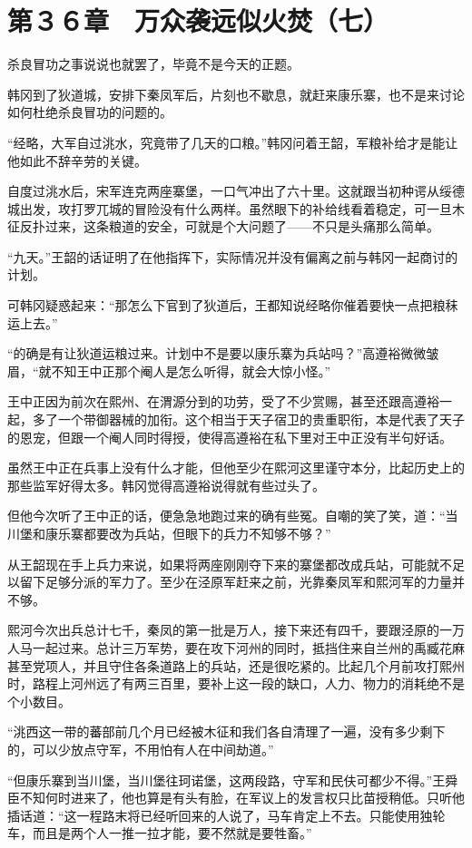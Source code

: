 \section{第３６章　万众袭远似火焚（七）}

杀良冒功之事说说也就罢了，毕竟不是今天的正题。

韩冈到了狄道城，安排下秦凤军后，片刻也不歇息，就赶来康乐寨，也不是来讨论如何杜绝杀良冒功的问题的。

“经略，大军自过洮水，究竟带了几天的口粮。”韩冈问着王韶，军粮补给才是能让他如此不辞辛劳的关键。

自度过洮水后，宋军连克两座寨堡，一口气冲出了六十里。这就跟当初种谔从绥德城出发，攻打罗兀城的冒险没有什么两样。虽然眼下的补给线看着稳定，可一旦木征反扑过来，这条粮道的安全，可就是个大问题了——不只是头痛那么简单。

“九天。”王韶的话证明了在他指挥下，实际情况并没有偏离之前与韩冈一起商讨的计划。

可韩冈疑惑起来：“那怎么下官到了狄道后，王都知说经略你催着要快一点把粮秣运上去。”

“的确是有让狄道运粮过来。计划中不是要以康乐寨为兵站吗？”高遵裕微微皱眉，“就不知王中正那个阉人是怎么听得，就会大惊小怪。”

王中正因为前次在熙州、在渭源分到的功劳，受了不少赏赐，甚至还跟高遵裕一起，多了一个带御器械的加衔。这个相当于天子宿卫的贵重职衔，本是代表了天子的恩宠，但跟一个阉人同时得授，使得高遵裕在私下里对王中正没有半句好话。

虽然王中正在兵事上没有什么才能，但他至少在熙河这里谨守本分，比起历史上的那些监军好得太多。韩冈觉得高遵裕说得就有些过头了。

但他今次听了王中正的话，便急急地跑过来的确有些冤。自嘲的笑了笑，道：“当川堡和康乐寨都要改为兵站，但眼下的兵力不知够不够？”

从王韶现在手上兵力来说，如果将两座刚刚夺下来的寨堡都改成兵站，可能就不足以留下足够分派的军力了。至少在泾原军赶来之前，光靠秦凤军和熙河军的力量并不够。

熙河今次出兵总计七千，秦凤的第一批是万人，接下来还有四千，要跟泾原的一万人马一起过来。总计三万军势，要在攻下河州的同时，抵挡住来自兰州的禹臧花麻甚至党项人，并且守住各条道路上的兵站，还是很吃紧的。比起几个月前攻打熙州时，路程上河州远了有两三百里，要补上这一段的缺口，人力、物力的消耗绝不是个小数目。

“洮西这一带的蕃部前几个月已经被木征和我们各自清理了一遍，没有多少剩下的，可以少放点守军，不用怕有人在中间劫道。”

“但康乐寨到当川堡，当川堡往珂诺堡，这两段路，守军和民伕可都少不得。”王舜臣不知何时进来了，他也算是有头有脸，在军议上的发言权只比苗授稍低。只听他插话道：“这一程路末将已经听回来的人说了，马车肯定上不去。只能使用独轮车，而且是两个人一推一拉才能，要不然就是要牲畜。”

